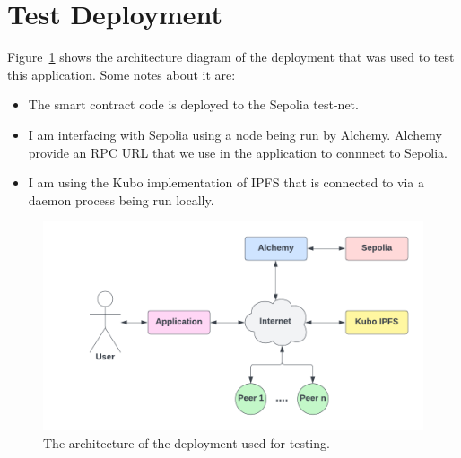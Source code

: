 
\section{Test Deployment}\label{app:test-deployment}

Figure~\ref{fig:test-deployment} shows the architecture diagram of the deployment that was used to test this application. Some notes about it are:

\begin{itemize}
  \item The smart contract code is deployed to the Sepolia test-net.
  \item I am interfacing with Sepolia using a node being run by Alchemy. Alchemy provide an RPC URL that we use in the application to connnect to Sepolia.
  \item I am using the Kubo implementation of IPFS that is connected to via a daemon process being run locally.
\end{itemize}

\begin{figure}[ht]
  \centering
  \includegraphics[width=.9\textwidth]{assets/images/diagrams/test-deployment.png}
  \caption{The architecture of the deployment used for testing.}
  \label{fig:test-deployment}
\end{figure}